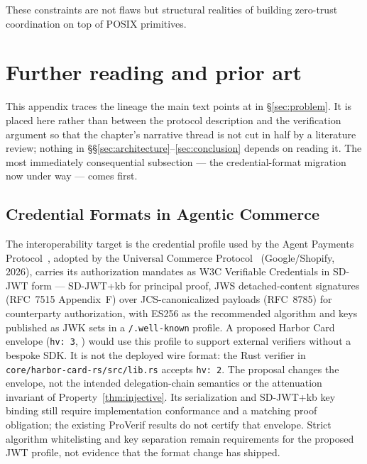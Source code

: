 \documentclass[11pt,a4paper]{article}
\theoremstyle{definition}
\begin{document}
These constraints are not flaws but structural realities of building zero-trust coordination on top of POSIX primitives.

\section{Further reading and prior art}\label{app:related}

This appendix traces the lineage the main text points at in \S\ref{sec:problem}. It is placed here rather than between the protocol description and the verification argument so that the chapter's narrative thread is not cut in half by a literature review; nothing in \S\S\ref{sec:architecture}--\ref{sec:conclusion} depends on reading it. The most immediately consequential subsection --- the credential-format migration now under way --- comes first.

\subsection{Credential Formats in Agentic Commerce}\label{app:credential-formats}

The interoperability target is the credential profile used by the Agent Payments
Protocol~, adopted by the Universal Commerce
Protocol~ (Google/Shopify, 2026), carries its authorization
mandates as W3C Verifiable Credentials in SD-JWT form --- SD-JWT+kb for
principal proof, JWS detached-content signatures (RFC~7515 Appendix~F) over
JCS-canonicalized payloads (RFC~8785) for counterparty authorization, with
ES256 as the recommended algorithm and keys published as JWK sets in a
\texttt{/.well-known} profile. A proposed Harbor Card envelope
(\texttt{hv:~3}, \Designed{}) would use this profile to support external verifiers
without a bespoke SDK. It is not the deployed wire format: the Rust verifier in
\texttt{core/harbor-card-rs/src/lib.rs} accepts \texttt{hv:~2}.
The proposal changes the envelope, not the intended delegation-chain semantics
or the attenuation invariant of Property~\ref{thm:injective}. Its serialization
and SD-JWT+kb key binding still require implementation conformance and a matching
proof obligation; the existing ProVerif results do not certify that envelope.
Strict algorithm whitelisting and key separation remain requirements for the
proposed JWT profile, not evidence that the format change has shipped.
\end{document}
